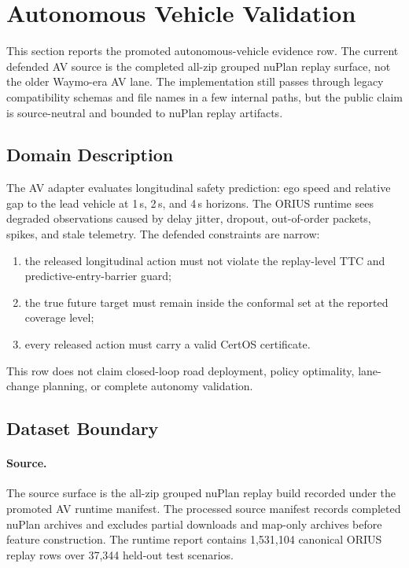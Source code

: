 \section{Autonomous Vehicle Validation}\label{sec:av}

This section reports the promoted autonomous-vehicle evidence row.  The current
defended AV source is the completed all-zip grouped nuPlan replay surface, not the
older Waymo-era AV lane.  The implementation still passes through legacy compatibility
schemas and file names in a few internal paths, but the public claim is
source-neutral and bounded to nuPlan replay artifacts.

\subsection{Domain Description}

The AV adapter evaluates longitudinal safety prediction: ego speed and relative
gap to the lead vehicle at 1\,s, 2\,s, and 4\,s horizons.  The ORIUS runtime sees
degraded observations caused by delay jitter, dropout, out-of-order packets,
spikes, and stale telemetry.  The defended constraints are narrow:
\begin{enumerate}[nosep]
  \item the released longitudinal action must not violate the replay-level
        TTC and predictive-entry-barrier guard;
  \item the true future target must remain inside the conformal set at the
        reported coverage level;
  \item every released action must carry a valid CertOS certificate.
\end{enumerate}
This row does not claim closed-loop road deployment, policy optimality, lane-change
planning, or complete autonomy validation.

\subsection{Dataset Boundary}

\paragraph{Source.}
The source surface is the all-zip grouped nuPlan replay build recorded under
the promoted AV runtime manifest.  The processed source manifest records completed
nuPlan archives and excludes partial downloads and map-only archives before feature
construction.  The runtime report contains 1{,}531{,}104 canonical ORIUS replay
rows over 37{,}344 held-out test scenarios.

